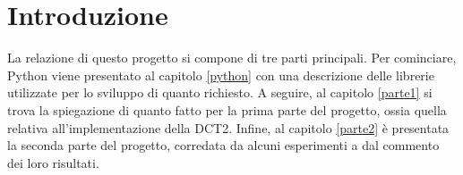 \section{Introduzione}
La relazione di questo progetto si compone di tre parti principali.
Per cominciare, Python viene presentato al capitolo \ref{python} con una descrizione delle librerie utilizzate per lo sviluppo di quanto richiesto.
A seguire, al capitolo \ref{parte1} si trova la spiegazione di quanto fatto per la prima parte del progetto, ossia quella relativa all'implementazione della DCT2. Infine, al capitolo \ref{parte2} è presentata la seconda parte del progetto, corredata da alcuni esperimenti a dal commento dei loro risultati.